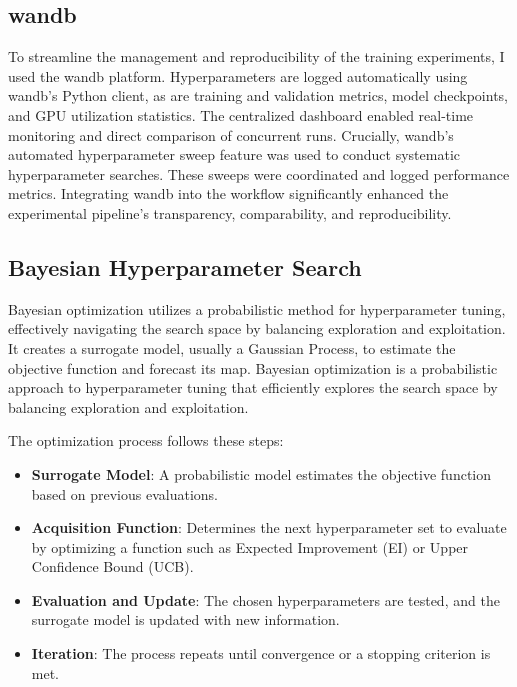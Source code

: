 \subsection{\acrfull{wandb}}
\label{ssec:wandb}
To streamline the management and reproducibility of the training experiments, I used the \acrlong{wandb} platform. Hyperparameters are logged automatically using \acrshort{wandb}'s Python client, as are training and validation metrics, model checkpoints, and GPU utilization statistics. The centralized dashboard enabled real-time monitoring and direct comparison of concurrent runs. Crucially, \acrshort{wandb}'s automated hyperparameter sweep feature was used to conduct systematic hyperparameter searches. These sweeps were coordinated and logged performance metrics. Integrating \acrshort{wandb} into the workflow significantly enhanced the experimental pipeline's transparency, comparability, and reproducibility.

\subsection{Bayesian Hyperparameter Search}

Bayesian optimization utilizes a probabilistic method for hyperparameter tuning, effectively navigating the search space by balancing exploration and exploitation. It creates a surrogate model, usually a Gaussian Process, to estimate the objective function and forecast its \acrshort{map}. Bayesian optimization is a probabilistic approach to hyperparameter tuning that efficiently explores the search space by balancing exploration and exploitation. 

The optimization process follows these steps:
\begin{itemize}
    \item \textbf{Surrogate Model}: A probabilistic model estimates the objective function based on previous evaluations.
    \item \textbf{Acquisition Function}: Determines the next hyperparameter set to evaluate by optimizing a function such as Expected Improvement (EI) or Upper Confidence Bound (UCB).
    \item \textbf{Evaluation and Update}: The chosen hyperparameters are tested, and the surrogate model is updated with new information.
    \item \textbf{Iteration}: The process repeats until convergence or a stopping criterion is met.
\end{itemize}

